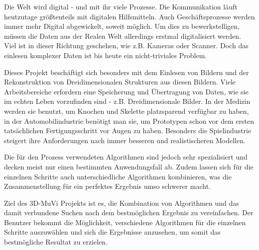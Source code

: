 Die Welt wird digital - und mit ihr viele Prozesse. Die Kommunikation läuft heutzutage größtenteils mit digitalen Hilfsmitteln. Auch Geschäftsprozesse werden immer mehr Digital abgewickelt, soweit möglich. Um dies zu bewerkstelligen, müssen die Daten aus der Realen Welt allerdings erstmal digitalisiert werden. Viel ist in dieser Richtung geschehen, wie z.B. Kameras oder Scanner. Doch das einlesen komplexer Daten ist bis heute ein nicht-triviales Problem.

Dieses Projekt beschäftigt sich besonders mit dem Einlesen von Bildern und der Rekonstruktion von Dreidimensionalen Strukturen aus diesen Bildern. Viele Arbeitsbereiche erfordern eine Speicherung und Übertragung von Daten, wie sie im echten Leben vorzufinden sind - z.B. Dreidimensionale Bilder. In der Medizin werden sie benutzt, um Knochen und Skelette platzsparend verfügbar zu haben, in der Automobilindustrie benötigt man sie, um Prototypen schon vor dem ersten tatsächlichen Fertigungsschritt vor Augen zu haben. Besonders die Spielindustrie steigert ihre Anforderungen nach immer besseren und realistischeren Modellen.

Die für den Prozess verwendeten Algorithmen sind jedoch sehr spezialisiert und decken meist nur einen bestimmten Anwendungsfall ab. Zudem lassen sich für die einzelnen Schritte auch unterschiedliche Algorithmen kombinieren, was die Zusammenstellung für ein perfektes Ergebnis umso schwerer macht.

Ziel des 3D-MuVi Projekts ist es, die Kombination von Algorithmen und das damit verbundene Suchen nach dem bestmöglichen Ergebnis zu vereinfachen. Der Benutzer bekommt die Möglichkeit, verschiedene Algorithmen für die einzelnen Schritte auszuwählen und sich die Ergebnisse anzusehen, um somit das bestmögliche Resultat zu erzielen.
